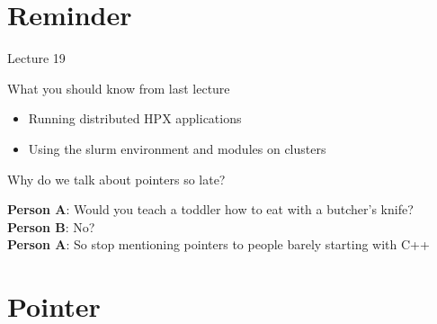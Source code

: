 \documentclass[\classoption]{beamer}
\title{\coursename}
\subtitle{Lecture 20: Managing memory and low-level data structures}
\author{\tiny Patrick Diehl \orcid{0000-0003-3922-8419}}
\date {
 \tiny \url{\courseurl}
\vspace{2cm}
\doclicenseThis  
  
}
\begin{document}
 {
    \frame {
        \titlepage
    }
}

\frame{

\tableofcontents

}


\section{Reminder}
\begin{frame}{Lecture 19}
\begin{block}{What you should know from last lecture}
\begin{itemize}
\item Running distributed HPX applications
\item Using the slurm environment and modules on clusters
\end{itemize}
\end{block}
\end{frame}


\begin{frame}{Why do we talk about pointers so late?}

\textbf{Person A}: Would you teach a toddler how to eat with a butcher's knife? \\
\vspace{1cm}
\textbf{Person B}: No? \\
\vspace{1cm}
\textbf{Person A}: So stop mentioning pointers to people barely starting with C++
\end{frame}


\section{Pointer}
\end{document}
